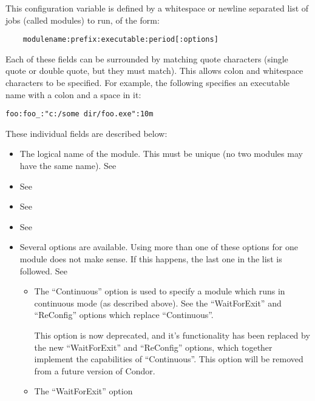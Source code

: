 \begin{description}
  This configuration variable is defined by
  a whitespace or newline separated list of jobs (called modules) to run, of the form:
\begin{verbatim}
	modulename:prefix:executable:period[:options]
\end{verbatim}
  Each of these fields can be surrounded by matching quote characters
  (single quote or double quote, but they must match).  This allows
  colon and whitespace characters to be specified.  For example, the
  following specifies an executable name with a colon and a space in it:
  \begin{verbatim}foo:foo_:"c:/some dir/foo.exe":10m\end{verbatim}
  These individual fields are described below: \begin{itemize}

    \item {} The logical name of the module.  This 
    must be unique (no two modules may have the same name).  See 

    \item {}
    See 

    \item {}
    See 

    \item {}
    See 

   \item Several options are available. Using more than one
   of these options for one module does not make sense.  If this happens,
   the last one in the list is followed. 
   See 

	\begin{itemize}
	\item The ``Continuous'' option is used to specify a module
	which runs in continuous mode (as described above).  See the
	``WaitForExit'' and ``ReConfig'' options which replace
	``Continuous''.

	This option is now deprecated, and it's functionality has been
	replaced by the new ``WaitForExit'' and ``ReConfig'' options,
	which together implement the capabilities of ``Continuous''.
	This option will be removed from a future version of Condor.

	\item The ``WaitForExit'' option


\end{itemize}
\end{itemize}
\end{description}
